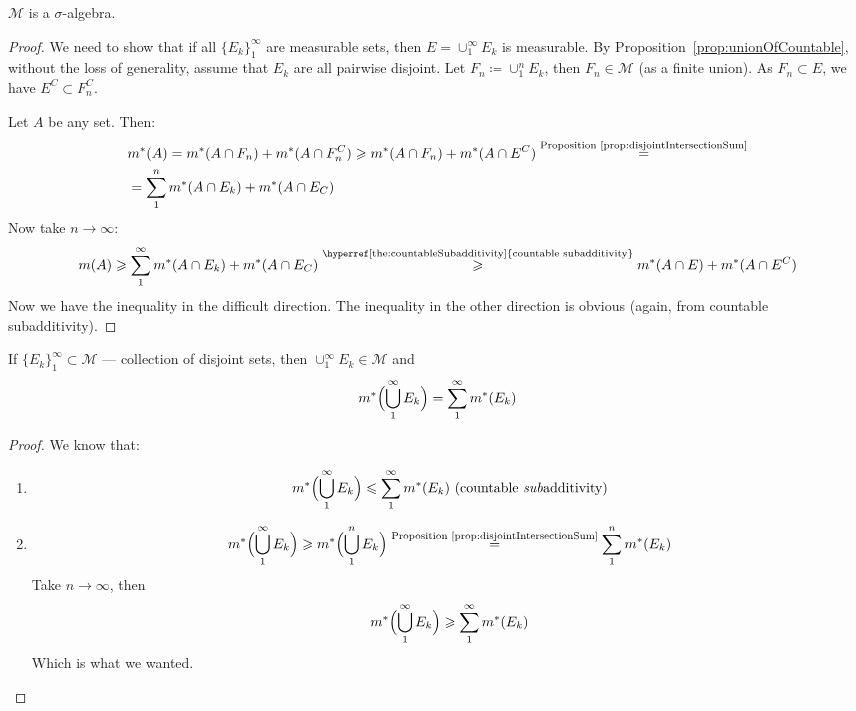 \begin{theorem}
    $\mathcal{M}$ is a $\sigma$-algebra.
\end{theorem}
\begin{proof}
    We need to show that if all $\{E_k\}_1^\infty$ are measurable sets,
    then $E = \cup_1^\infty E_k$ is measurable. 
    By Proposition~\ref{prop:unionOfCountable}, without the loss of generality,
    assume that $E_k$ are all pairwise disjoint.
    Let $F_n \coloneqq \cup_1^n E_k$, then $F_n \in \mathcal{M}$
    (as a finite union). As $F_n \subset E$, we have $E^C \subset F_n^C$.

    Let $A$ be any set. Then:
    \begin{align*}
        &
        m^*(A) = m^*(A \cap F_n) + m^*(A \cap F_n^C) \ge
        m^*(A \cap F_n) + m^*(A \cap E^C)
        \overset{\text{Proposition~\ref{prop:disjointIntersectionSum}}}{=}
        \\&=
        \sum_1^n m^*(A \cap E_k) + m^*(A \cap E_C)
    \end{align*}
    Now take $n \to \infty$:
    \begin{align*}
        m(A) \ge \sum_1^\infty m^*(A \cap E_k) + m^*(A \cap E_C)
        \overset{\text{\hyperref[the:countableSubadditivity]{countable subadditivity}}}{\ge}
        m^*(A \cap E) + m^*(A \cap E^C)
    \end{align*}
    Now we have the inequality in the difficult direction. The inequality in the other direction
    is obvious (again, from countable subadditivity).
\end{proof}

\begin{proposition}
    If $\{E_k\}_1^\infty \subset \mathcal{M}$ --- collection of
    disjoint sets, then  $\cup_1^\infty E_k \in \mathcal{M}$
    and
    \[ m^*\Bigl(\bigcup_1^\infty E_k\Bigr) = \sum_1^\infty m^*(E_k) \] 
\end{proposition}
\begin{proof}
    We know that:
    \begin{enumerate}
        \item {
            \[ m^*\Bigl( \bigcup_1^\infty E_k \Bigr) \le
            \sum_1^\infty m^*(E_k) \text{ (countable \textit{sub}additivity)}\]
        }
        \item {
            \[ m^*\Bigl(\bigcup_1^\infty E_k\Bigr) \ge
            m^*\Bigl( \bigcup_1^n E_k \Bigr) \overset{\text{Proposition~\ref{prop:disjointIntersectionSum}}}{=}
            \sum_1^n m^*(E_k) \]
            Take $n \to \infty$, then
            \[ m^*\Bigl( \bigcup_1^\infty E_k \Bigr) \ge 
            \sum_1^\infty m^*(E_k) \]
            Which is what we wanted.
        }
    \end{enumerate}
\end{proof}

